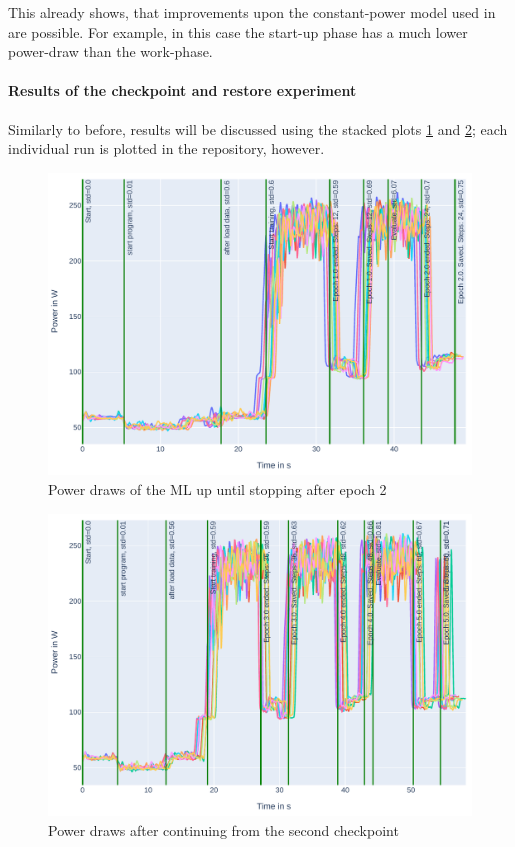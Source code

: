 This already shows, that improvements upon the constant-power model used in \cite{wiesner_lets_2021} are possible. 
For example, in this case the start-up phase has a much lower power-draw than the work-phase.

\paragraph{Results of the checkpoint and restore experiment}

Similarly to before, results will be discussed using the stacked plots \ref{fig:plot_partial_saved_stacked} and \ref{fig:plot_partial_saved_continue_stacked}; each individual run is plotted in the repository, however.

\begin{figure}
    \includegraphics[width=\linewidth]{power-measurements/stacked_plots/roberta_stop_after_saving.pdf}
    \caption{Power draws of the ML up until stopping after epoch 2}
    \label{fig:plot_partial_saved_stacked}
\end{figure}

\begin{figure}
    \includegraphics[width=\linewidth]{power-measurements/stacked_plots/roberta_continue_after_saving.pdf}
    \caption{Power draws after continuing from the second checkpoint}
    \label{fig:plot_partial_saved_continue_stacked}
\end{figure}

